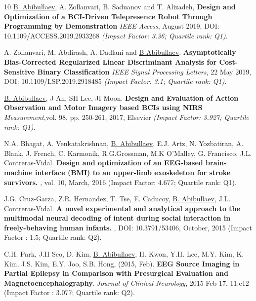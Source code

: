\documentclass[10pt,letterpaper,sans]{moderncv}   %
\begin{document}
\begin{thebibliography}{10}
    \small 
    \underline{B. Abibullaev}, A. Zollanvari, B. Saduanov and T. Alizadeh, 
    \newblock \textbf{Design and Optimization of a BCI-Driven Telepresence Robot Through Programming by Demonstration}
    \newblock \textit{IEEE Access}, August 2019,  DOI: 10.1109/ACCESS.2019.2933268
    \textit{(Impact Factor: 3.36; Quartile rank: Q1)}.

    \small 
    A. Zollanvari,  M. Abdirash, A. Dadlani and \underline{B Abibullaev}.
    \newblock \textbf{Asymptotically Bias-Corrected Regularized Linear Discriminant Analysis for Cost-Sensitive Binary Classification}
    \newblock \textit{IEEE Signal Processing Letters}, 22 May 2019,  DOI: 10.1109/LSP.2019.2918485 \textit{(Impact Factor: 3.1; Quartile rank: Q1)}.
        
    \small 
    \underline{B. Abibullaev}, J An, SH Lee, JI Moon.
    \newblock \textbf{Design and Evaluation of Action Observation and Motor Imagery based {BCIs} using {NIRS}} \newblock \textit{Measurement},vol. 98, pp. 250-261, 2017, Elsevier \textit{(Impact Factor: 3.927; Quartile rank: Q1)}.
    
    \small
    N.A. Bhagat, A. Venkatakrishnan, \underline{B. Abibullaev}, E.J. Artz, N. Yozbatiran, A. Blank, J. French, C. Karmonik, R.G.Grossman, M.K O'Malley, G. Francisco, J.L. Contreras-Vidal.
    \newblock \textbf{Design and optimization of an {EEG}-based brain-machine interface (BMI) to an upper-limb exoskeleton for stroke survivors.}
    , vol. 10, March, 2016 (Impact Factor: 4.677; Quartile rank: Q1).
    
    \small
    J.G. Cruz-Garza, Z.R. Hernandez, T. Tse, E. Caducoy, \underline{B. Abibullaev}, J.L. Contreras-Vidal.
    \newblock \textbf{A novel experimental and analytical approach to the multimodal neural decoding of intent during social interaction in freely-behaving human infants.}
    , DOI: 10.3791/53406, October, 2015 (Impact Factor : 1.5; Quartile rank: Q2).
    
    \small
    C.H. Park, J.H Seo, D. Kim, \underline{B. Abibullaev}, H. Kwon, Y.H. Lee, M.Y. Kim, K. Kim, J.S. Kim, E.Y. Joo, S.B. Hong, (2015, Feb). 
    \newblock \textbf{{EEG} Source Imaging in Partial Epilepsy in Comparison with Presurgical Evaluation and Magnetoencephalography.}
    {\em Journal of Clinical Neurology}, 2015 Feb 17, 11:e12 (Impact Factor : 3.077; Quartile rank: Q2).
    

\end{thebibliography}
\end{document}
